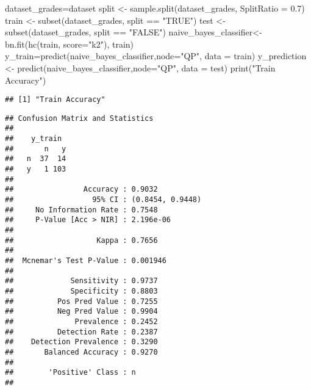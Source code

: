 \documentclass[
]{article}
\newenvironment{Shaded}{\begin{snugshade}}{\end{snugshade}}
\newcommand{\AttributeTok}[1]{\textcolor[rgb]{0.77,0.63,0.00}{#1}}
\newcommand{\FloatTok}[1]{\textcolor[rgb]{0.00,0.00,0.81}{#1}}
\newcommand{\FunctionTok}[1]{\textcolor[rgb]{0.00,0.00,0.00}{#1}}
\newcommand{\NormalTok}[1]{#1}
\newcommand{\OtherTok}[1]{\textcolor[rgb]{0.56,0.35,0.01}{#1}}
\newcommand{\SpecialCharTok}[1]{\textcolor[rgb]{0.00,0.00,0.00}{#1}}
\newcommand{\StringTok}[1]{\textcolor[rgb]{0.31,0.60,0.02}{#1}}
\begin{document}
\begin{Shaded}
\begin{Highlighting}[]
\NormalTok{dataset\_grades}\OtherTok{=}\NormalTok{dataset}
\NormalTok{split }\OtherTok{\textless{}{-}} \FunctionTok{sample.split}\NormalTok{(dataset\_grades, }\AttributeTok{SplitRatio =} \FloatTok{0.7}\NormalTok{) }
\NormalTok{train }\OtherTok{\textless{}{-}} \FunctionTok{subset}\NormalTok{(dataset\_grades, split }\SpecialCharTok{==} \StringTok{"TRUE"}\NormalTok{) }
\NormalTok{test }\OtherTok{\textless{}{-}} \FunctionTok{subset}\NormalTok{(dataset\_grades, split }\SpecialCharTok{==} \StringTok{"FALSE"}\NormalTok{) }
\NormalTok{naive\_bayes\_classifier}\OtherTok{\textless{}{-}} \FunctionTok{bn.fit}\NormalTok{(}\FunctionTok{hc}\NormalTok{(train, }\AttributeTok{score=}\StringTok{"k2"}\NormalTok{), train)}
\NormalTok{y\_train}\OtherTok{=}\FunctionTok{predict}\NormalTok{(naive\_bayes\_classifier,}\AttributeTok{node=}\StringTok{"QP"}\NormalTok{, }\AttributeTok{data =}\NormalTok{ train)}
\NormalTok{y\_prediction }\OtherTok{\textless{}{-}} \FunctionTok{predict}\NormalTok{(naive\_bayes\_classifier,}\AttributeTok{node=}\StringTok{"QP"}\NormalTok{, }\AttributeTok{data =}\NormalTok{ test)}
\FunctionTok{print}\NormalTok{(}\StringTok{"Train Accuracy"}\NormalTok{)}
\end{Highlighting}
\end{Shaded}

\begin{verbatim}
## [1] "Train Accuracy"
\end{verbatim}

\begin{Shaded}
\end{Shaded}

\begin{verbatim}
## Confusion Matrix and Statistics
## 
##    y_train
##       n   y
##   n  37  14
##   y   1 103
##                                           
##                Accuracy : 0.9032          
##                  95% CI : (0.8454, 0.9448)
##     No Information Rate : 0.7548          
##     P-Value [Acc > NIR] : 2.196e-06       
##                                           
##                   Kappa : 0.7656          
##                                           
##  Mcnemar's Test P-Value : 0.001946        
##                                           
##             Sensitivity : 0.9737          
##             Specificity : 0.8803          
##          Pos Pred Value : 0.7255          
##          Neg Pred Value : 0.9904          
##              Prevalence : 0.2452          
##          Detection Rate : 0.2387          
##    Detection Prevalence : 0.3290          
##       Balanced Accuracy : 0.9270          
##                                           
##        'Positive' Class : n               
## 
\end{verbatim}
\end{document}
